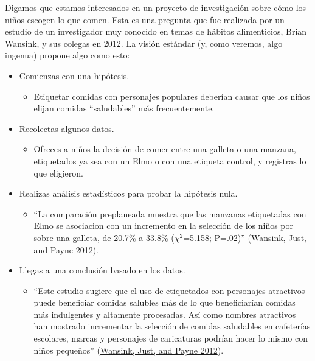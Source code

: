 \documentclass[
  12pt,
]{book}
\providecommand{\tightlist}{%
  \setlength{\itemsep}{0pt}\setlength{\parskip}{0pt}}
\begin{document}
Digamos que estamos interesados en un proyecto de investigación sobre cómo los niños escogen lo que comen. Esta es una pregunta que fue realizada por un estudio de un investigador muy conocido en temas de hábitos alimenticios, Brian Wansink, y sus colegas en 2012. La visión estándar (y, como veremos, algo ingenua) propone algo como esto:

\begin{itemize}
\tightlist
\item
  Comienzas con una hipótesis.

  \begin{itemize}
  \tightlist
  \item
    Etiquetar comidas con personajes populares deberían causar que los niños elijan comidas ``saludables'' más frecuentemente.
  \end{itemize}
\item
  Recolectas algunos datos.

  \begin{itemize}
  \tightlist
  \item
    Ofreces a niños la decisión de comer entre una galleta o una manzana, etiquetados ya sea con un Elmo o con una etiqueta control, y registras lo que eligieron.
  \end{itemize}
\item
  Realizas análisis estadísticos para probar la hipótesis nula.

  \begin{itemize}
  \tightlist
  \item
    ``La comparación preplaneada muestra que las manzanas etiquetadas con Elmo se asociacion con un incremento en la selección de los niños por sobre una galleta, de 20.7\% a 33.8\% (\(\chi^2\)=5.158; P=.02)'' (\protect\hyperlink{ref-wans:just:payn:2012}{Wansink, Just, and Payne 2012}).
  \end{itemize}
\item
  Llegas a una conclusión basado en los datos.

  \begin{itemize}
  \tightlist
  \item
    ``Este estudio sugiere que el uso de etiquetados con personajes atractivos puede beneficiar comidas salubles más de lo que beneficiarían comidas más indulgentes y altamente procesadas. Así como nombres atractivos han mostrado incrementar la selección de comidas saludables en cafeterías escolares, marcas y personajes de caricaturas podrían hacer lo mismo con niños pequeños'' (\protect\hyperlink{ref-wans:just:payn:2012}{Wansink, Just, and Payne 2012}).
  \end{itemize}
\end{itemize}
\end{document}
